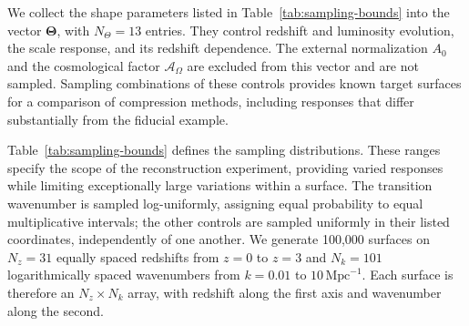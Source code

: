 We collect the shape parameters listed in Table~\ref{tab:sampling-bounds}
into the vector $\bm{\Theta}$, with $N_\Theta=13$ entries. They control
redshift and luminosity evolution, the scale response, and its redshift
dependence. The external normalization $A_0$ and the cosmological factor
$\mathcal A_\Omega$ are excluded from this vector and are not sampled.
Sampling combinations of these controls provides known target surfaces
for a comparison of compression methods, including responses that differ
substantially from the fiducial example.

Table~\ref{tab:sampling-bounds} defines the sampling distributions. These
ranges specify the scope of the reconstruction experiment, providing
varied responses while limiting exceptionally large variations within a
surface. The transition wavenumber is sampled log-uniformly, assigning
equal probability to equal multiplicative intervals; the other controls
are sampled uniformly in their listed coordinates, independently of one
another. We generate 100,000
surfaces on $N_z=31$ equally spaced redshifts from $z=0$ to $z=3$ and
$N_k=101$ logarithmically spaced wavenumbers from $k=0.01$ to
$10\,\mathrm{Mpc}^{-1}$. Each surface is therefore an $N_z\times N_k$
array, with redshift along the first axis and wavenumber along the second.

